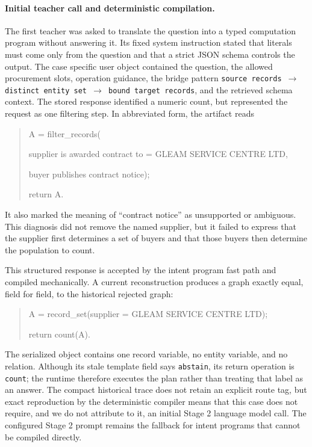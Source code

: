 \documentclass{article}
\begin{document}
\paragraph{Initial teacher call and deterministic compilation.}
The first teacher was asked to translate the question into a typed computation program without
answering it.  Its fixed system instruction stated that literals must come only from the question
and that a strict JSON schema controls the output.  The case specific user object contained the
question, the allowed procurement slots, operation guidance, the bridge pattern
\texttt{source records $\rightarrow$ distinct entity set $\rightarrow$ bound target records}, and
the retrieved schema context.  The stored response identified a numeric count, but represented the
request as one filtering step.  In abbreviated form, the artifact reads
\begin{quote}\small\ttfamily
A = filter\_records(\par
\hspace*{1em}supplier is awarded contract to = GLEAM SERVICE CENTRE LTD,\par
\hspace*{1em}buyer publishes contract notice);\par
return A.
\end{quote}
It also marked the meaning of ``contract notice'' as unsupported or ambiguous.  This diagnosis did
not remove the named supplier, but it failed to express that the supplier first determines a set of
buyers and that those buyers then determine the population to count.

This structured response is accepted by the intent program fast path and compiled mechanically.  A
current reconstruction produces a graph exactly equal, field for field, to the historical rejected
graph:
\begin{quote}\small\ttfamily
A = record\_set(supplier = GLEAM SERVICE CENTRE LTD);\par
return count(A).
\end{quote}
The serialized object contains one record variable, no entity variable, and no relation.  Although
its stale template field says \texttt{abstain}, its return operation is \texttt{count}; the runtime
therefore executes the plan rather than treating that label as an answer.  The compact historical
trace does not retain an explicit route tag, but exact reproduction by the deterministic compiler
means that this case does not require, and we do not attribute to it, an initial Stage 2 language
model call.  The configured Stage 2 prompt remains the fallback for intent programs that cannot be
compiled directly.
\end{document}
